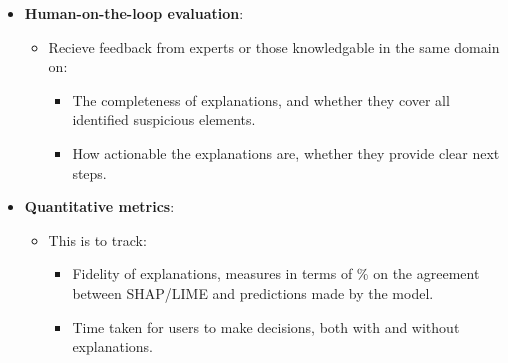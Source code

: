 \begin{itemize}
  \item \textbf{Human-on-the-loop evaluation}:
  \begin{itemize}
    \item Recieve feedback from experts or those knowledgable in the same domain on:
    \begin{itemize}
      \item The completeness of explanations, and whether they cover all identified suspicious elements.
      \item How actionable the explanations are, whether they provide clear next steps.
    \end{itemize}
  \end{itemize}
  \item \textbf{Quantitative metrics}:
  \begin{itemize}
    \item This is to track:
    \begin{itemize}
      \item Fidelity of explanations, measures in terms of \% on the agreement between SHAP/LIME and predictions made by the model.
      \item Time taken for users to make decisions, both with and without explanations.
    \end{itemize}
  \end{itemize}
\end{itemize}
